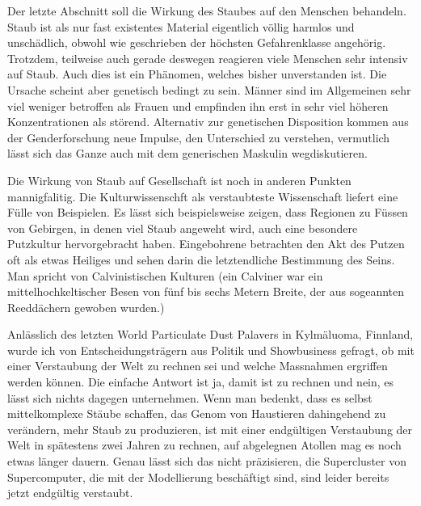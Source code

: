 Der letzte Abschnitt soll die Wirkung des Staubes auf den Menschen behandeln. Staub ist als nur fast existentes Material eigentlich völlig harmlos und unschädlich, obwohl wie geschrieben der höchsten Gefahrenklasse angehörig. Trotzdem, teilweise auch gerade deswegen reagieren viele Menschen sehr intensiv auf Staub. Auch dies ist ein Phänomen, welches bisher unverstanden ist. Die Ursache scheint aber genetisch bedingt zu sein. Männer sind im Allgemeinen sehr viel weniger betroffen als Frauen und empfinden ihn erst in sehr viel höheren Konzentrationen als störend. Alternativ zur genetischen Disposition kommen aus der Genderforschung neue Impulse, den Unterschied zu verstehen, vermutlich lässt sich das Ganze auch mit dem generischen Maskulin wegdiskutieren. 

Die Wirkung von Staub auf Gesellschaft ist noch in anderen Punkten mannigfalitig. Die Kulturwissenschft als verstaubteste Wissenschaft liefert eine Fülle von Beispielen. Es lässt sich beispielsweise zeigen, dass Regionen zu Füssen von Gebirgen, in denen viel Staub angeweht wird, auch eine besondere Putzkultur hervorgebracht haben. Eingebohrene betrachten den Akt des Putzen oft als etwas Heiliges und sehen darin die letztendliche Bestimmung des Seins. Man spricht von Calvinistischen Kulturen (ein Calviner war ein mittelhochkeltischer Besen von fünf bis sechs Metern Breite, der aus sogeannten Reeddächern gewoben wurden.)



Anlässlich des letzten World Particulate Dust Palavers in Kylmäluoma, Finnland, wurde ich von Entscheidungsträgern aus Politik und Showbusiness gefragt, ob mit einer Verstaubung der Welt zu rechnen sei und welche Massnahmen ergriffen werden können. Die einfache Antwort ist ja, damit ist zu rechnen und nein, es lässt sich nichts dagegen unternehmen. Wenn man bedenkt, dass es selbst mittelkomplexe Stäube schaffen, das Genom von Haustieren dahingehend zu verändern, mehr Staub zu produzieren, ist mit einer endgültigen Verstaubung der Welt in spätestens zwei Jahren zu rechnen, auf abgelegnen Atollen mag es noch etwas länger dauern. Genau lässt sich das nicht präzisieren, die Supercluster von Supercomputer, die mit der Modellierung beschäftigt sind, sind leider bereits jetzt endgültig verstaubt.

 \vfill

